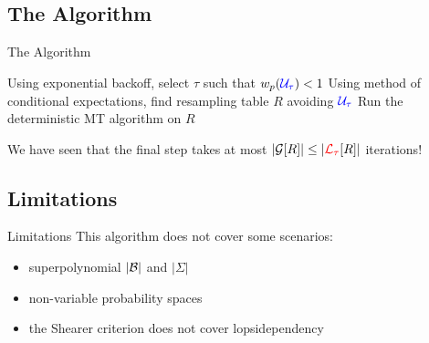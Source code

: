 \documentclass{beamer}
\def\spadding{\vspace{0.25cm}}
\begin{document}
\subsection{The Algorithm}
\begin{frame}{The Algorithm}
\begin{algorithm}[H]
\pause
Using exponential backoff, select $\tau$ such that $w_p(\textcolor{blue}{\mathcal{U}_\tau}) < 1$\;\pause
Using method of conditional expectations, find resampling table $R$ avoiding $\textcolor{blue}{\mathcal{U}_\tau}$\;\pause
Run the deterministic MT algorithm on $R$\;
\end{algorithm}\pause\spadding

We have seen that the final step takes at most $|\mathcal{G}[R]| \leq |\textcolor{red}{\mathcal{L}_\tau}[R]|$ iterations!
\end{frame}

\subsection{Limitations}
\begin{frame}{Limitations}
This algorithm does not cover some scenarios:
\begin{itemize}
    \item superpolynomial $|\mathcal{B}|$ and $|\Sigma|$\pause
    \item non-variable probability spaces\pause
    \item the Shearer criterion does not cover lopsidependency
\end{itemize}
\end{frame}

    
    
\end{document}
